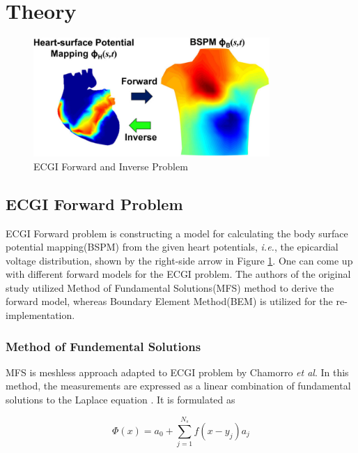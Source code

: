 \documentclass[draftcls, onecolumn, journal]{IEEEtran}
\begin{document}
\newpage

\section{Theory}\label{sec:theory}

\begin{figure}[h]
    \centering
    \includegraphics[width=0.8\textwidth]{../images/The-illustration-of-forward-and-inverse-ECG-problems.png}
    \caption{ECGI Forward and Inverse Problem}\label{fig:ECG}
\end{figure}

\subsection{ECGI Forward Problem}\label{subsec:ecgfor}

\indent ECGI Forward problem is constructing a model for calculating the body surface potential mapping(BSPM) from the given heart potentials, \textit{i.e.}, the epicardial voltage distribution, shown by the right-side arrow in Figure \ref{fig:ECG}. One can come up with different forward models for the ECGI problem. The authors of the original study utilized Method of Fundamental Solutions(MFS) method to derive the forward model, whereas Boundary Element Method(BEM) is utilized for the re-implementation. 

\subsubsection{Method of Fundemental Solutions} \label{subsec:MFS}
\indent MFS is meshless approach adapted to ECGI problem by Chamorro \textit{et al}. In this method, the measurements are expressed as a linear combination of fundamental solutions to the Laplace equation \cite*{wang2006application}. It is formulated as

\begin{equation}
    \Phi (x) = a_0 + \sum\limits_{j=1}^{N_s} f(x-y_j)a_j
    \label{eq:MFS}
\end{equation}
\end{document}
